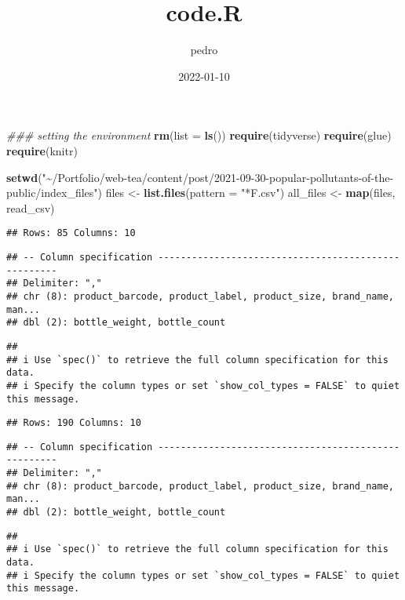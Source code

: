 \documentclass[
]{article}
\title{code.R}
\author{pedro}
\date{2022-01-10}
\newenvironment{Shaded}{\begin{snugshade}}{\end{snugshade}}
\newcommand{\CommentTok}[1]{\textcolor[rgb]{0.56,0.35,0.01}{\textit{#1}}}
\newcommand{\DataTypeTok}[1]{\textcolor[rgb]{0.13,0.29,0.53}{#1}}
\newcommand{\KeywordTok}[1]{\textcolor[rgb]{0.13,0.29,0.53}{\textbf{#1}}}
\newcommand{\NormalTok}[1]{#1}
\newcommand{\StringTok}[1]{\textcolor[rgb]{0.31,0.60,0.02}{#1}}
\begin{document}
\maketitle

\begin{Shaded}
\begin{Highlighting}[]
\CommentTok{\#\#\# setting the environment}
\KeywordTok{rm}\NormalTok{(}\DataTypeTok{list =} \KeywordTok{ls}\NormalTok{())}
\KeywordTok{require}\NormalTok{(tidyverse)}
\KeywordTok{require}\NormalTok{(glue)}
\KeywordTok{require}\NormalTok{(knitr)}


\KeywordTok{setwd}\NormalTok{(}\StringTok{"\textasciitilde{}/Portfolio/web{-}tea/content/post/2021{-}09{-}30{-}popular{-}pollutants{-}of{-}the{-}public/index\_files"}\NormalTok{)}
\NormalTok{files \textless{}{-}}\StringTok{ }\KeywordTok{list.files}\NormalTok{(}\DataTypeTok{pattern =} \StringTok{"*F.csv"}\NormalTok{)}
\NormalTok{all\_files \textless{}{-}}\StringTok{ }\KeywordTok{map}\NormalTok{(files, read\_csv)}
\end{Highlighting}
\end{Shaded}

\begin{verbatim}
## Rows: 85 Columns: 10
\end{verbatim}

\begin{verbatim}
## -- Column specification ----------------------------------------------------
## Delimiter: ","
## chr (8): product_barcode, product_label, product_size, brand_name, man...
## dbl (2): bottle_weight, bottle_count
\end{verbatim}

\begin{verbatim}
## 
## i Use `spec()` to retrieve the full column specification for this data.
## i Specify the column types or set `show_col_types = FALSE` to quiet this message.
\end{verbatim}

\begin{verbatim}
## Rows: 190 Columns: 10
\end{verbatim}

\begin{verbatim}
## -- Column specification ----------------------------------------------------
## Delimiter: ","
## chr (8): product_barcode, product_label, product_size, brand_name, man...
## dbl (2): bottle_weight, bottle_count
\end{verbatim}

\begin{verbatim}
## 
## i Use `spec()` to retrieve the full column specification for this data.
## i Specify the column types or set `show_col_types = FALSE` to quiet this message.
\end{verbatim}
\end{document}
